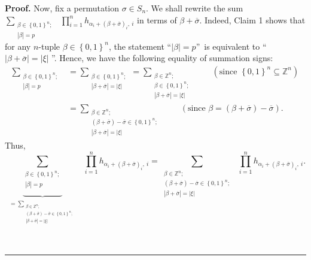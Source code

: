 \documentclass[numbers=enddot,12pt,final,onecolumn,notitlepage,english]{scrartcl}%
\theoremstyle{definition}
\newenvironment{proof}[1][Proof]{\noindent\textbf{#1.} }{\ \rule{0.5em}{0.5em}}
\let\sumnonlimits\sum
\let\prodnonlimits\prod
\renewcommand{\sum}{\sumnonlimits\limits}
\renewcommand{\prod}{\prodnonlimits\limits}
\newenvironment{verlong}{}{}
\begin{document}
\begin{verlong}
\begin{proof}
Now, fix a permutation $\sigma\in S_{n}$. We shall rewrite the sum
$\sum_{\substack{\beta\in\left\{  0,1\right\}  ^{n};\\\left\vert
\beta\right\vert =p}}\ \ \prod_{i=1}^{n}h_{\alpha_{i}+\left(  \beta
+\overline{\sigma}\right)  _{i},\ i}$ in terms of $\beta+\overline{\sigma}$.
Indeed, Claim 1 shows that for any $n$-tuple $\beta\in\left\{  0,1\right\}
^{n}$, the statement \textquotedblleft$\left\vert \beta\right\vert
=p$\textquotedblright\ is equivalent to \textquotedblleft$\left\vert
\beta+\overline{\sigma}\right\vert =\left\vert \xi\right\vert $%
\textquotedblright. Hence, we have the following equality of summation signs:%
\begin{align*}
\sum_{\substack{\beta\in\left\{  0,1\right\}  ^{n};\\\left\vert \beta
\right\vert =p}}  &  =\sum_{\substack{\beta\in\left\{  0,1\right\}
^{n};\\\left\vert \beta+\overline{\sigma}\right\vert =\left\vert
\xi\right\vert }}=\sum_{\substack{\beta\in\mathbb{Z}^{n};\\\beta\in\left\{
0,1\right\}  ^{n};\\\left\vert \beta+\overline{\sigma}\right\vert =\left\vert
\xi\right\vert }}\ \ \ \ \ \ \ \ \ \ \left(  \text{since }\left\{
0,1\right\}  ^{n}\subseteq\mathbb{Z}^{n}\right) \\
&  =\sum_{\substack{\beta\in\mathbb{Z}^{n};\\\left(  \beta+\overline{\sigma
}\right)  -\overline{\sigma}\in\left\{  0,1\right\}  ^{n};\\\left\vert
\beta+\overline{\sigma}\right\vert =\left\vert \xi\right\vert }%
}\ \ \ \ \ \ \ \ \ \ \left(  \text{since }\beta=\left(  \beta+\overline
{\sigma}\right)  -\overline{\sigma}\right)  .
\end{align*}
Thus,%
\[
\underbrace{\sum_{\substack{\beta\in\left\{  0,1\right\}  ^{n};\\\left\vert
\beta\right\vert =p}}}_{\substack{=\sum_{\substack{\beta\in\mathbb{Z}%
^{n};\\\left(  \beta+\overline{\sigma}\right)  -\overline{\sigma}\in\left\{
0,1\right\}  ^{n};\\\left\vert \beta+\overline{\sigma}\right\vert =\left\vert
\xi\right\vert }}}}\ \ \prod_{i=1}^{n}h_{\alpha_{i}+\left(  \beta
+\overline{\sigma}\right)  _{i},\ i}=\sum_{\substack{\beta\in\mathbb{Z}%
^{n};\\\left(  \beta+\overline{\sigma}\right)  -\overline{\sigma}\in\left\{
0,1\right\}  ^{n};\\\left\vert \beta+\overline{\sigma}\right\vert =\left\vert
\xi\right\vert }}\ \ \prod_{i=1}^{n}h_{\alpha_{i}+\left(  \beta+\overline
{\sigma}\right)  _{i},\ i}.
\]



\end{proof}
\end{verlong}
\end{document}
